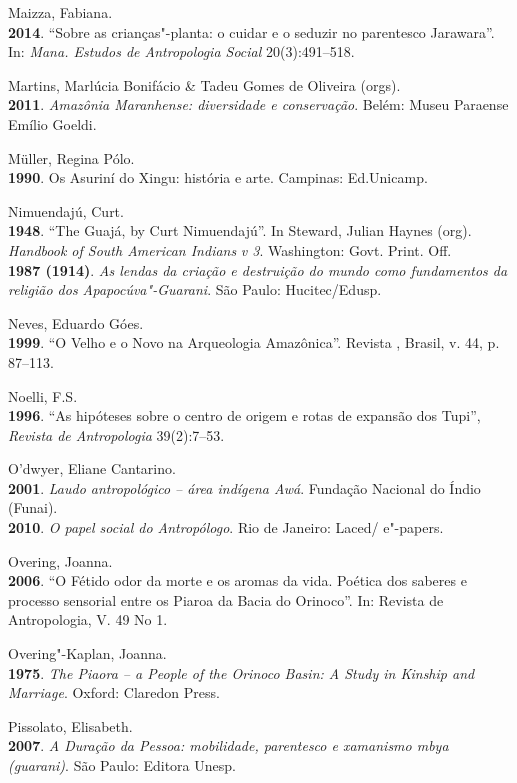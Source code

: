 \begin{Parskip}
Maizza, Fabiana.\\
\textbf{2014}. ``Sobre as crianças"-planta: o cuidar e o seduzir no
parentesco Jarawara''. In: \emph{Mana. Estudos de Antropologia Social}
20(3):491--518.

Martins, Marlúcia Bonifácio \& Tadeu Gomes de Oliveira (orgs).\\
\textbf{2011}. \emph{Amazônia Maranhense: diversidade e conservação}.
Belém: Museu Paraense Emílio Goeldi.

Müller, Regina Pólo.\\
\textbf{1990}. Os Asuriní do Xingu: história e arte. Campinas:
Ed.Unicamp.

Nimuendajú, Curt.\\
\textbf{1948}. ``The Guajá, by Curt Nimuendajú''. In Steward, Julian
Haynes (org). \emph{Handbook of South American Indians} \emph{v 3}.
Washington: Govt. Print. Off.\\
\textbf{1987 (1914)}. \emph{As lendas da criação e destruição do mundo
como fundamentos da religião dos Apapocúva"-Guarani}. São Paulo:
Hucitec/Edusp.

Neves, Eduardo Góes.\\
\textbf{1999}. ``O Velho e o Novo na Arqueologia Amazônica''. Revista
, Brasil, v. 44, p. 87--113.

Noelli, F.S.\\
\textbf{1996}. ``As hipóteses sobre o centro de origem e rotas de
expansão dos Tupi'', \emph{Revista de Antropologia} 39(2):7--53.

O'dwyer, Eliane Cantarino.\\
\textbf{2001}. \emph{Laudo antropológico -- área indígena Awá}. Fundação
Nacional do Índio (Funai).\\
\textbf{2010}. \emph{O papel social do Antropólogo}. Rio de Janeiro:
Laced/ e"-papers.

Overing, Joanna.\\
\textbf{2006}. ``O Fétido odor da morte e os aromas da vida. Poética dos
saberes e processo sensorial entre os Piaroa da Bacia do Orinoco''. In:
Revista de Antropologia, V. 49 No 1.

Overing"-Kaplan, Joanna.\\
\textbf{1975}. \emph{The Piaora -- a People of the Orinoco Basin: A Study
in Kinship and Marriage}. Oxford: Claredon Press.

Pissolato, Elisabeth.\\
\textbf{2007}. \emph{A Duração da Pessoa: mobilidade, parentesco e
xamanismo mbya (guarani)}. São Paulo: Editora Unesp.


\end{Parskip}
